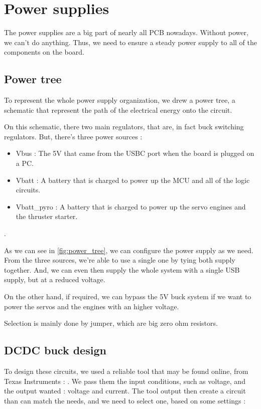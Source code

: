 \section{Power supplies}
The power supplies are a big part of nearly all PCB nowadays. Without power, we
can't do anything. Thus, we need to ensure a steady power supply to all of the
components on the board.

\subsection{Power tree}
To represent the whole power supply organization, we drew a power tree, a
schematic that represent the path of the electrical energy onto the circuit.



On this schematic, there two main regulators, that are, in fact buck switching
regulators. But, there's three power sources :
\begin{itemize}[noitemsep]
    \item   Vbus : The 5V that came from the USBC port when the board is plugged on a PC.
    \item   Vbatt : A battery that is charged to power up the MCU and all of the logic
          circuits.
    \item   Vbatt\_pyro : A battery that is charged to power up the servo engines and the
          thruster starter.
\end{itemize}.

As we can see in \ref{fig:power_tree}, we can configure the power supply as we
need. From the three sources, we're able to use a single one by tying both
supply together. And, we can even then supply the whole system with a single
USB supply, but at a reduced voltage.

On the other hand, if required, we can bypass the 5V buck system if we want to
power the servos and the engines with an higher voltage.

Selection is mainly done by jumper, which are big zero ohm resistors.

\subsection{DCDC buck design}
To design these circuits, we used a reliable tool that may be found online,
from Texas Instruments : \cite{POWERDESIGNER}. We pass them the input
conditions, such as voltage, and the output wanted : voltage and current. The
tool output then create a circuit than can match the needs, and we need to
select one, based on some settings :


